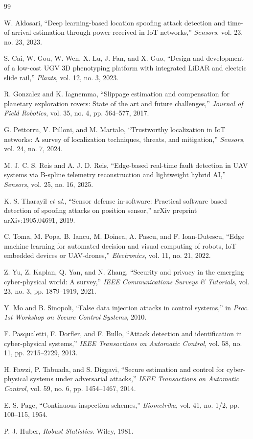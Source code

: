 \documentclass[conference]{IEEEtran}
\begin{document}
\begin{thebibliography}{99}

W. Aldosari, ``Deep learning-based location spoofing attack detection and
time-of-arrival estimation through power received in IoT networks,''
\emph{Sensors}, vol. 23, no. 23, 2023.

S. Cai, W. Gou, W. Wen, X. Lu, J. Fan, and X. Guo, ``Design and development
of a low-cost UGV 3D phenotyping platform with integrated LiDAR and electric
slide rail,'' \emph{Plants}, vol. 12, no. 3, 2023.

R. Gonzalez and K. Iagnemma, ``Slippage estimation and compensation for
planetary exploration rovers: State of the art and future challenges,''
\emph{Journal of Field Robotics}, vol. 35, no. 4, pp. 564--577, 2017.

G. Pettorru, V. Pilloni, and M. Martalo, ``Trustworthy localization in IoT
networks: A survey of localization techniques, threats, and mitigation,''
\emph{Sensors}, vol. 24, no. 7, 2024.

M. J. C. S. Reis and A. J. D. Reis, ``Edge-based real-time fault detection in
UAV systems via B-spline telemetry reconstruction and lightweight hybrid AI,''
\emph{Sensors}, vol. 25, no. 16, 2025.

K. S. Tharayil \emph{et al.}, ``Sensor defense in-software: Practical
software based detection of spoofing attacks on position sensor,'' arXiv
preprint arXiv:1905.04691, 2019.

C. Toma, M. Popa, B. Iancu, M. Doinea, A. Pascu, and F. Ioan-Dutescu, ``Edge
machine learning for automated decision and visual computing of robots, IoT
embedded devices or UAV-drones,'' \emph{Electronics}, vol. 11, no. 21, 2022.

Z. Yu, Z. Kaplan, Q. Yan, and N. Zhang, ``Security and privacy in the emerging
cyber-physical world: A survey,'' \emph{IEEE Communications Surveys \&
Tutorials}, vol. 23, no. 3, pp. 1879--1919, 2021.

Y. Mo and B. Sinopoli, ``False data injection attacks in control systems,'' in
\emph{Proc. 1st Workshop on Secure Control Systems}, 2010.

F. Pasqualetti, F. Dorfler, and F. Bullo, ``Attack detection and
identification in cyber-physical systems,'' \emph{IEEE Transactions on
Automatic Control}, vol. 58, no. 11, pp. 2715--2729, 2013.

H. Fawzi, P. Tabuada, and S. Diggavi, ``Secure estimation and control for
cyber-physical systems under adversarial attacks,'' \emph{IEEE Transactions
on Automatic Control}, vol. 59, no. 6, pp. 1454--1467, 2014.

E. S. Page, ``Continuous inspection schemes,'' \emph{Biometrika}, vol. 41,
no. 1/2, pp. 100--115, 1954.

P. J. Huber, \emph{Robust Statistics}. Wiley, 1981.

\end{thebibliography}
\end{document}
